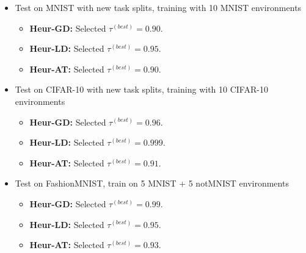 \begin{itemize}
    \item Test on MNIST with new task splits, training with 10 MNIST environments
    \begin{itemize}
        \item {\bf Heur-GD:} Selected $\tau^{(best)} = 0.90$. %
        \item {\bf Heur-LD:} Selected $\tau^{(best)} = 0.95$. %
        \item {\bf Heur-AT:} Selected $\tau^{(best)} = 0.90$. %
    \end{itemize}
    \item Test on CIFAR-10 with new task splits, training with 10 CIFAR-10 environments
    \begin{itemize}
        \item {\bf Heur-GD:} Selected $\tau^{(best)} = 0.96$. %
        \item {\bf Heur-LD:} Selected $\tau^{(best)} = 0.999$. %
        \item {\bf Heur-AT:} Selected $\tau^{(best)} = 0.91$. %
    \end{itemize}
    \item Test on FashionMNIST, train on 5 MNIST + 5 notMNIST environments
    \begin{itemize}
        \item {\bf Heur-GD:} Selected $\tau^{(best)} = 0.99$. %
        \item {\bf Heur-LD:} Selected $\tau^{(best)} = 0.95$. %
        \item {\bf Heur-AT:} Selected $\tau^{(best)} = 0.93$. %
    \end{itemize}
\end{itemize}



